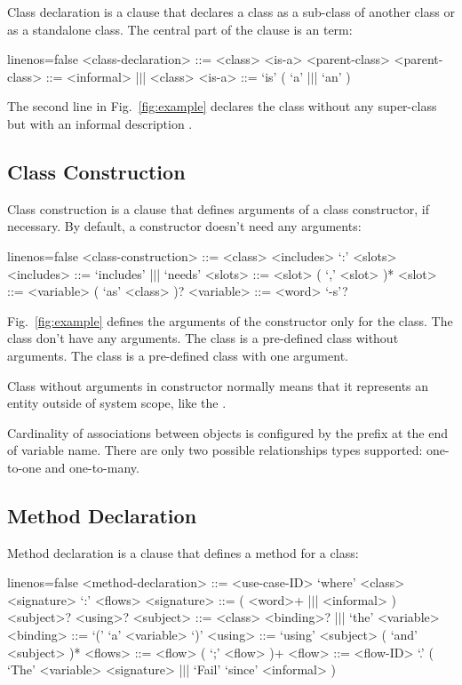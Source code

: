\documentclass[sigplan,10pt,nonacm=true]{acmart}
\begin{document}
Class declaration is a clause that declares a class as a sub-class of
another class or as a standalone class. The central part of the clause is
an  term:

\begin{ffcode*}{linenos=false}
<class-declaration> ::= <class>
  <is-a> <parent-class>
<parent-class> ::= <informal> |$\vert$| <class>
<is-a> ::= `is' ( `a' |$\vert$| `an' )
\end{ffcode*}

The second line in Fig.~\ref{fig:example} declares the class 
without any super-class but with an informal description
.

\subsection{Class Construction}

Class construction is a clause that defines arguments of a class
constructor, if necessary. By default, a constructor doesn't need any
arguments:

\begin{ffcode*}{linenos=false}
<class-construction> ::= <class> <includes>
  `:' <slots>
<includes> ::= `includes' |$\vert$| `needs'
<slots> ::= <slot> ( `,' <slot> )*
<slot> ::= <variable> ( `as' <class> )?
<variable> ::= <word> `-s'?
\end{ffcode*}

Fig.~\ref{fig:example} defines the arguments of the constructor only for
the  class. The class  don't have any arguments. The class
 is a pre-defined class without arguments. The class  is a
pre-defined class with one argument.

Class without arguments in constructor normally means that it represents an
entity outside of system scope, like the .

Cardinality of associations between objects is configured by the 
prefix at the end of variable name. There are only
two possible relationships types supported: one-to-one and one-to-many.

\subsection{Method Declaration}

Method declaration is a clause that defines a method for a class:

\begin{ffcode*}{linenos=false}
<method-declaration> ::= <use-case-ID> `where'
<class> <signature> `:' <flows>
<signature> ::= ( <word>+ |$\vert$| <informal> )
  <subject>? <using>?
<subject> ::= <class> <binding>?
  |$\vert$| `the' <variable>
<binding> ::= `(' `a' <variable> `)'
<using> ::= `using' <subject>
  ( `and' <subject> )*
<flows> ::= <flow> ( `;' <flow> )+
<flow> ::= <flow-ID> `.'
  (
    `The' <variable> <signature>
    |$\vert$|
    `Fail' `since' <informal>
  )
\end{ffcode*}
\end{document}
